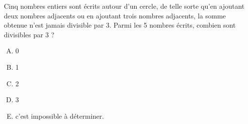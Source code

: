 Cinq nombres entiers sont écrits autour d'un cercle, de telle sorte
qu'en ajoutant deux nombres adjacents ou en ajoutant trois nombres
adjacents, la somme obtenue n'est jamais divisible par 3. Parmi les 5
nombres écrits, combien sont divisibles par 3 ?
\begin{multicols}{3}
  \begin{enumerate}[A)]
  \item 0
  \item 1
  \item 2
  \item 3
  \item c'est impossible à déterminer.
  \end{enumerate}
\end{multicols}